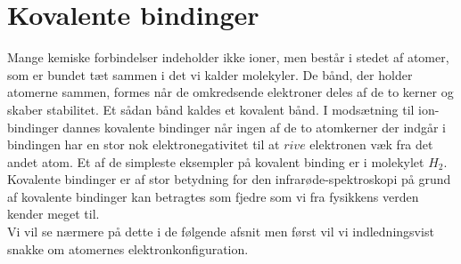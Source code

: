 \chapter{Kovalente bindinger}
Mange kemiske forbindelser indeholder ikke ioner, men består i stedet af atomer, som er bundet tæt sammen i det vi kalder molekyler. De bånd, der holder atomerne sammen, formes når de omkredsende elektroner deles af de to kerner og skaber stabilitet. Et sådan bånd kaldes et kovalent bånd. I modsætning til ion-bindinger dannes kovalente bindinger når ingen af de to atomkerner der indgår i bindingen har en stor nok elektronegativitet til at $rive$ elektronen væk fra det andet atom. Et af de simpleste eksempler på kovalent binding er i molekylet $H_2$. Kovalente bindinger er af stor betydning for den infrarøde-spektroskopi på grund af kovalente bindinger kan betragtes som fjedre som vi fra fysikkens verden kender meget til.
\\
Vi vil se nærmere på dette i de følgende afsnit men først vil vi indledningsvist snakke om atomernes elektronkonfiguration. 

